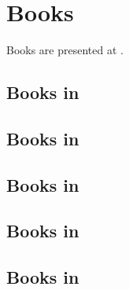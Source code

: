 



\chapter{Books}\label{Books}

Books are presented at .


\section{Books in \mxsrToMsr{}}


\section{Books in \mxsrToMsr{}}


\section{Books in \msrToMsr{}}


\section{Books in \msrToLpsr{}}


\section{Books in \lpsrToLilypond{}}


